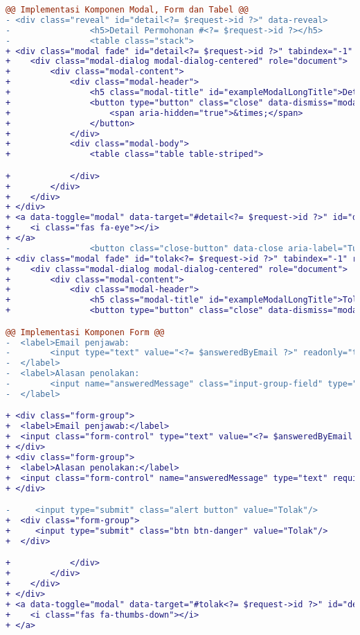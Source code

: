 \begin{lstlisting}[language=diff, caption=Perubahan file \path{\views\TranskripManage\main.php}, label=Entri, basicstyle=\ttfamily, frame=single,
columns=fullflexible, keepspaces=true, breaklines=true]
@@ Implementasi Komponen Modal, Form dan Tabel @@ 
- <div class="reveal" id="detail<?= $request->id ?>" data-reveal>
-                <h5>Detail Permohonan #<?= $request->id ?></h5>
-                <table class="stack">
+ <div class="modal fade" id="detail<?= $request->id ?>" tabindex="-1" role="dialog" aria-hidden="true">
+    <div class="modal-dialog modal-dialog-centered" role="document">
+        <div class="modal-content">
+            <div class="modal-header">
+                <h5 class="modal-title" id="exampleModalLongTitle">Detail Permohonan #<?= $request->id ?></h5>
+                <button type="button" class="close" data-dismiss="modal" aria-label="Close">
+                    <span aria-hidden="true">&times;</span>
+                </button>
+            </div>
+            <div class="modal-body">
+                <table class="table table-striped">

+            </div>
+        </div>
+    </div>
+ </div>
+ <a data-toggle="modal" data-target="#detail<?= $request->id ?>" id="detailIkon<?= $request->id ?>">
+    <i class="fas fa-eye"></i>
+ </a>
-                <button class="close-button" data-close aria-label="Tutup" type="button">
+ <div class="modal fade" id="tolak<?= $request->id ?>" tabindex="-1" role="dialog" aria-hidden="true">
+    <div class="modal-dialog modal-dialog-centered" role="document">
+        <div class="modal-content">
+            <div class="modal-header">
+                <h5 class="modal-title" id="exampleModalLongTitle">Tolak Permohonan #<?= $request->id ?></h5>
+                <button type="button" class="close" data-dismiss="modal" aria-label="Close">

@@ Implementasi Komponen Form @@
-  <label>Email penjawab:
-        <input type="text" value="<?= $answeredByEmail ?>" readonly="true"/>
-  </label>
-  <label>Alasan penolakan:
-        <input name="answeredMessage" class="input-group-field" type="text" required/>
-  </label>

+ <div class="form-group">
+  <label>Email penjawab:</label>
+  <input class="form-control" type="text" value="<?= $answeredByEmail ?>" readonly="true"/>
+ </div>
+ <div class="form-group">
+  <label>Alasan penolakan:</label>
+  <input class="form-control" name="answeredMessage" type="text" required/>
+ </div>

-     <input type="submit" class="alert button" value="Tolak"/>
+  <div class="form-group">
+     <input type="submit" class="btn btn-danger" value="Tolak"/>
+  </div>

+            </div>
+        </div>
+    </div>
+ </div>
+ <a data-toggle="modal" data-target="#tolak<?= $request->id ?>" id="detailIkon<?= $request->id ?>">
+    <i class="fas fa-thumbs-down"></i>
+ </a>


\end{lstlisting}
